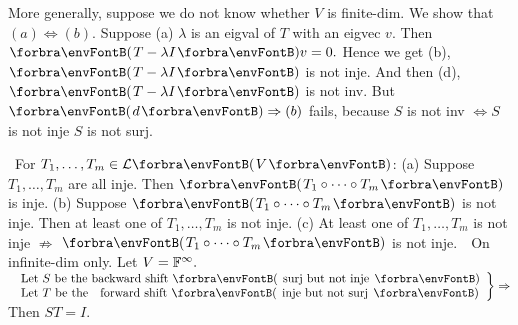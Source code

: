 \documentclass[a4paper, 11pt, UTF8]{article}
\begin{document}
\begin{large}
\vspace{10pt}

\BulletPointX\NoteForSmall{[5.6]}\TextB{}
More generally, suppose we do not know whether $V$ is finite-dim. We show that $(a)\Longleftrightarrow(b).$\TextB{}
Suppose (a) $\lambda$ is an eigval of $T$ with an eigvec $v.$ Then $\Par{T-\lambda I}v=0.$\TextB{}
Hence we get (b), $\Par{T-\lambda I}$ is not inje. And then (d), $\Par{T-\lambda I}$ is not inv.\TextB{}
But $\Par{d}\Rightarrow(b)$ fails, because $S$ is not inv $\Longleftrightarrow S$ is not inje \OR $S$ is not surj.\par
\SepLine



\BulletPointX\Tips \,\,\,For $T_1,\dots,T_m\in\Lm{V}$:\TextB{\vspace{-2pt}}
(a) Suppose $T_1,\dots,T_m$ are all inje. Then $\Par{T_1\circ\cdots\circ T_m}$ is inje.\TextB{}
(b) Suppose $\Par{T_1\circ\cdots\circ T_m}$ is not inje. Then at least one of $T_1,\dots,T_m$ is not inje.\TextB{}
(c) At least one of $T_1,\dots,T_m$ is not inje $\nRightarrow$ $\Par{T_1\circ\cdots\circ T_m}$ is not inje.\TextB{}\Hc
\Example\,\, On infinite-dim only. Let $V={\mathbb{F}}^\infty.$\TextB{}\Hc
$\MathRightBrace{l}{$ Let $S$ be the backward shift \Par{ surj but not inje }$\\$ Let $T$ be the \,\,\,\,forward shift \Par{ inje but not surj }$}\Rightarrow$ Then $ST=I.$\PfEnd
\SepLine


\end{large}
\end{document}
